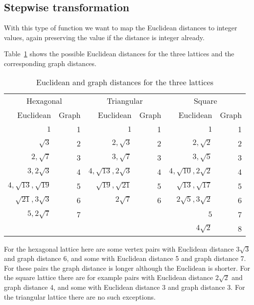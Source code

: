 \documentclass[smallextended]{svjour3}
\begin{document}
\subsection{Stepwise transformation}

With this type of function we want to map the Euclidean distances to integer
values, again preserving the value if the distance is integer already.

Table~\ref{tab:2} shows the possible Euclidean distances for the three lattices
and the corresponding graph distances.

\begin{table}[h]
\begin{center}
\renewcommand{\arraystretch}{1.3}
\renewcommand{\tabcolsep}{8pt}
\begin{tabular}{|r|r||r|r||r|r|}
\hline 
\multicolumn{2}{|c||}{Hexagonal} & \multicolumn{2}{c||}{Triangular} & \multicolumn{2}{c|}{Square} \\
 Euclidean & Graph & Euclidean & Graph & Euclidean & Graph\\
\hline 
$1$                              & 1  & $1$                              & 1 & $1$ & 1\\
$\sqrt{3}$                    & 2   & $2,\sqrt{3}$                 & 2 & $2,\sqrt{2}$ & 2\\
$2,\sqrt{7}$                 & 3   & $3,\sqrt{7}$                 & 3 & $3,\sqrt{5}$ & 3\\
$3,2\sqrt{3}$               & 4   & $4,\sqrt{13},2\sqrt{3}$ & 4 & $4,\sqrt{10},2\sqrt{2}$ & 4\\
$4,\sqrt{13},\sqrt{19}$ & 5  & $\sqrt{19},\sqrt{21}$    & 5 & $\sqrt{13},\sqrt{17}$ & 5\\
$\sqrt{21},3\sqrt{3}$   & 6   & $2\sqrt{7}$                  & 6 & $2\sqrt{5},3\sqrt{2}$ & 6\\
$5,2\sqrt{7}$               & 7  &                                     &   & $5$ & 7\\
                               &     &                                         &   & $4\sqrt{2}$ & 8\\
\hline
\end{tabular}
\end{center}
\caption{Euclidean and graph distances for the three lattices}\label{tab:2}
\end{table}

For the hexagonal lattice here are some vertex pairs with Euclidean distance $3\sqrt{3}$
and graph distance 6, and some with Euclidean distance 5 and graph
distance 7. For these pairs the graph distance is longer although the
Euclidean is shorter. For the square lattice there are for example
pairs with Euclidean distance $2\sqrt{2}$
and graph distance 4, and some with Euclidean distance 3 and graph
distance 3. For the triangular lattice there are no such exceptions.
\end{document}
